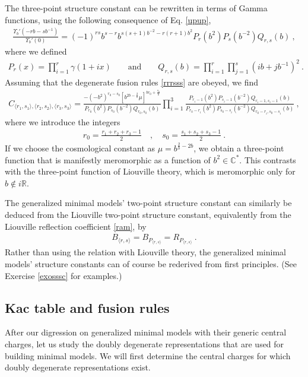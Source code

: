 \documentclass[12pt, a4paper, notitlepage, twoside]{report}
\numberwithin{equation}{section}
\theoremstyle{break}
\begin{document}
The three-point structure constant can be rewritten in terms of Gamma functions, using the following consequence of Eq. \eqref{upup},
\begin{align}
 \frac{\Upsilon_b'(-rb-sb^{-1})}{\Upsilon_b'(0)} = (-1)^{rs} b^{s-r} b^{s(s+1)b^{-2}-r(r+1)b^2} P_r(b^2)P_s(b^{-2}) Q_{r,s}(b)\ ,
\end{align}
where we defined
\begin{align}
 P_r(x) = \prod_{i=1}^r \gamma(1+ix) \qquad \text{and} \qquad Q_{r,s}(b) = \prod_{i=1}^r \prod_{j=1}^s (ib+jb^{-1})^2\ .
\end{align}
Assuming that the degenerate fusion rules \eqref{rrrsss} are obeyed, we find 
\begin{align}
 C_{\langle r_1,s_1\rangle ,\langle r_2,s_2\rangle ,\langle r_3,s_3 \rangle} =  \frac{-(-b^2)^{r_0-s_0}\left[b^{2b-\frac{2}{b}}\mu\right]^{br_0 + \frac{s_0}{b}}}{P_{r_0}(b^2)P_{s_0}(b^{-2})Q_{r_0,s_0}(b)} \prod_{i=1}^3 \frac{P_{r_i-1}(b^2)P_{s_i-1}(b^{-2}) Q_{r_i-1,s_i-1}(b)}{P_{r_0-r_i}(b^2)P_{s_0-s_i}(b^{-2}) Q_{r_0-r_i,s_0-s_i}(b)} \ ,
\label{cpqb}
\end{align}
where we introduce the integers
\begin{align}
 r_0 = \frac{r_1+r_2+r_3-1}{2} \quad , \quad s_0=\frac{s_1+s_2+s_3-1}{2}\ .
\end{align}
If we choose the cosmological constant as $\mu = b^{\frac{2}{b}-2b}$, we obtain a three-point function that is manifestly meromorphic as a function of $b^2\in {\mathbb{C}}^*$.
This contrasts with the three-point function of Liouville theory, which is
meromorphic only for $b\notin i\mathbb{R}$. 

The generalized minimal models' two-point structure constant can similarly be deduced from the Liouville two-point structure constant, equivalently from the Liouville reflection coefficient \eqref{ram}, by 
\begin{align}
B_{\langle r,s\rangle} = B_{P_{\langle r,s\rangle}} = R_{P_{\langle r,s\rangle}}\ .
\end{align}
Rather than using the relation with Liouville theory, the generalized minimal models' structure constants can of course be rederived from first principles. (See Exercise \ref{exosssc} for examples.)

\subsection{Kac table and fusion rules \label{secmmf}}

After our digression on generalized minimal models with their generic central charges, let us study the doubly degenerate representations that are used for building minimal models. We will first determine the central charges for which doubly degenerate representations exist. 
\end{document}
